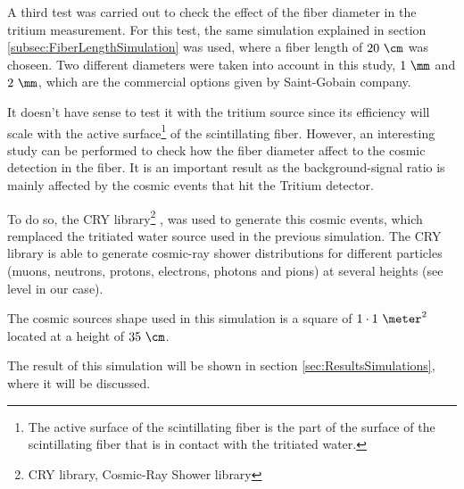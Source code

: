 A third test was carried out to check the effect of the fiber diameter in the tritium measurement. For this test, the same simulation explained in section \ref{subsec:FiberLengthSimulation} was used, where a fiber length of $20~\cm$ was choseen. Two different diameters were taken into account in this study, $1~\mm$ and $2~\mm$, which are the commercial options given by Saint-Gobain company.

It doesn't have sense to test it with the tritium source since its efficiency will scale with the active surface\footnote{The active surface of the scintillating fiber is the part of the surface of the scintillating fiber that is in contact with the tritiated water.} of the scintillating fiber. However, an interesting study can be performed to check how the fiber diameter affect to the cosmic detection in the fiber. It is an important result as the background-signal ratio is mainly affected by the cosmic events that hit the Tritium detector.

To do so, the CRY library\footnote{CRY library, Cosmic-Ray Shower library} \cite{CRYwebsite}, \cite{CRYpaper} was used to generate this cosmic events, which remplaced the tritiated water source used in the previous simulation. The CRY library is able to generate cosmic-ray shower distributions for different particles (muons, neutrons, protons, electrons, photons and pions) at several heights (see level in our case).

The cosmic sources shape used in this simulation is a square of $1\cdot 1~\meter ^2$ located at a height of $35~\cm$.

The result of this simulation will be shown in section \ref{sec:ResultsSimulations}, where it will be discussed.